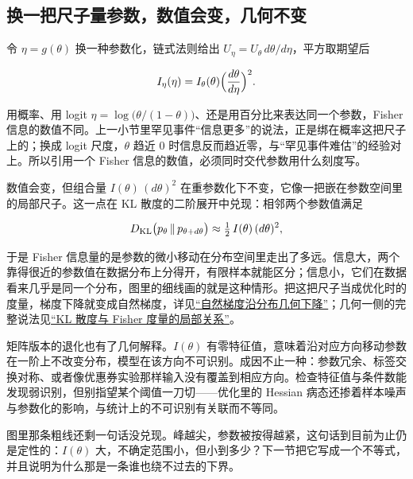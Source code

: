 \subsection{换一把尺子量参数，数值会变，几何不变}

令 \(\eta=g(\theta)\) 换一种参数化，链式法则给出 \(U_\eta=U_\theta\,d\theta/d\eta\)，平方取期望后

\[
I_\eta(\eta)=I_\theta(\theta)\Bigl(\frac{d\theta}{d\eta}\Bigr)^2.
\]

用概率、用 logit \(\eta=\log\bigl(\theta/(1-\theta)\bigr)\)、还是用百分比来表达同一个参数，Fisher 信息的数值不同。上一小节里罕见事件``信息更多''的说法，正是绑在概率这把尺子上的；换成 logit 尺度，\(\theta\) 趋近 \(0\) 时信息反而趋近零，与``罕见事件难估''的经验对上。所以引用一个 Fisher 信息的数值，必须同时交代参数用什么刻度写。

数值会变，但组合量 \(I(\theta)\,(d\theta)^2\) 在重参数化下不变，它像一把嵌在参数空间里的局部尺子。这一点在 KL 散度的二阶展开中兑现：相邻两个参数值满足

\[
D_{\mathrm{KL}}\bigl(p_\theta\,\Vert\,p_{\theta+d\theta}\bigr)\approx\tfrac12\,I(\theta)\,(d\theta)^2,
\]

于是 Fisher 信息量的是参数的微小移动在分布空间里走出了多远。信息大，两个靠得很近的参数值在数据分布上分得开，有限样本就能区分；信息小，它们在数据看来几乎是同一个分布，图里的细线画的就是这种情形。把这把尺子当成优化时的度量，梯度下降就变成自然梯度，详见\hyperref[sec:12-Real-Analysis-Support/09-Information-Geometry/02]{``自然梯度沿分布几何下降''}；几何一侧的完整说法见\hyperref[sec:12-Real-Analysis-Support/09-Information-Geometry/03]{``KL 散度与 Fisher 度量的局部关系''}。

矩阵版本的退化也有了几何解释。\(I(\theta)\) 有零特征值，意味着沿对应方向移动参数在一阶上不改变分布，模型在该方向不可识别。成因不止一种：参数冗余、标签交换对称、或者像优惠券实验那样输入没有覆盖到相应方向。检查特征值与条件数能发现弱识别，但别指望某个阈值一刀切——优化里的 Hessian 病态还掺着样本噪声与参数化的影响，与统计上的不可识别有关联而不等同。

图里那条粗线还剩一句话没兑现。峰越尖，参数被按得越紧，这句话到目前为止仍是定性的：\(I(\theta)\) 大，不确定范围小，但小到多少？下一节把它写成一个不等式，并且说明为什么那是一条谁也绕不过去的下界。
